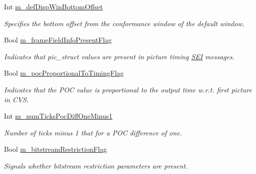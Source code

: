 \begin{DoxyCompactItemize}
\mbox{\label{class_t_app_enc_cfg_aba5bd8611ead97d784e6ac41991a74a7}} 
Int \hyperlink{class_t_app_enc_cfg_aba5bd8611ead97d784e6ac41991a74a7}{m\+\_\+def\+Disp\+Win\+Bottom\+Offset}
\begin{DoxyCompactList}\small\item\em Specifies the bottom offset from the conformance window of the default window. \end{DoxyCompactList}\item 
\mbox{\label{class_t_app_enc_cfg_a76795f377997dc00deddbeb226b03ff5}} 
Bool \hyperlink{class_t_app_enc_cfg_a76795f377997dc00deddbeb226b03ff5}{m\+\_\+frame\+Field\+Info\+Present\+Flag}
\begin{DoxyCompactList}\small\item\em Indicates that pic\+\_\+struct values are present in picture timing \hyperlink{class_s_e_i}{S\+EI} messages. \end{DoxyCompactList}\item 
\mbox{\label{class_t_app_enc_cfg_a9631e41bcad7547f018e753a2300b301}} 
Bool \hyperlink{class_t_app_enc_cfg_a9631e41bcad7547f018e753a2300b301}{m\+\_\+poc\+Proportional\+To\+Timing\+Flag}
\begin{DoxyCompactList}\small\item\em Indicates that the P\+OC value is proportional to the output time w.\+r.\+t. first picture in C\+VS. \end{DoxyCompactList}\item 
\mbox{\label{class_t_app_enc_cfg_add0a3b8d86b2cca3888440f3b6a85d1a}} 
Int \hyperlink{class_t_app_enc_cfg_add0a3b8d86b2cca3888440f3b6a85d1a}{m\+\_\+num\+Ticks\+Poc\+Diff\+One\+Minus1}
\begin{DoxyCompactList}\small\item\em Number of ticks minus 1 that for a P\+OC difference of one. \end{DoxyCompactList}\item 
\mbox{\label{class_t_app_enc_cfg_a77cc35c5e0ad0651c3894f9114f26da9}} 
Bool \hyperlink{class_t_app_enc_cfg_a77cc35c5e0ad0651c3894f9114f26da9}{m\+\_\+bitstream\+Restriction\+Flag}
\begin{DoxyCompactList}\small\item\em Signals whether bitstream restriction parameters are present. \end{DoxyCompactList}\item 

\end{DoxyCompactItemize}
